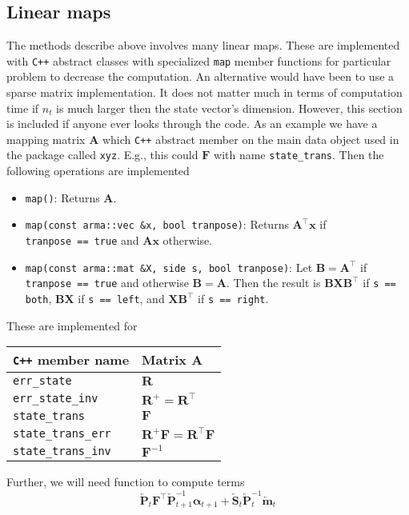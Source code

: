\documentclass[notitlepage]{article}
\renewcommand{\vec}[1]{\bm{#1}}
\newcommand{\vecLarrow}[1]{\overleftarrow{\vec{#1}}}
\newcommand{\mat}[1]{\mathbf{#1}}
\newcommand{\matLarrow}[1]{\overleftarrow{\mat{#1}}}
\begin{document}
\subsection{Linear maps}
The methods describe above involves many linear maps. These are implemented with \texttt{C++} 
abstract classes with specialized \texttt{map} member functions for particular problem to 
decrease the computation. An alternative would have been to use a sparse matrix implementation.
It does not matter much in terms of computation time if $n_t$ is much larger then 
the state vector's dimension. However, this section is included if anyone ever looks through 
the code.  
As an example we have a mapping matrix $\mat{A}$ which \texttt{C++} abstract member on the main 
data object used in the package called \texttt{xyz}. E.g., this could $\mat{F}$ with name 
\texttt{state\_trans}. Then the following operations are implemented %
%
\begin{itemize}
\item \texttt{map()}: Returns $\mat{A}$.
%
\item \texttt{map(const arma::vec \&x, bool tranpose)}: Returns $\mat{A}^\top\vec{x}$ if \\ \texttt{tranpose == true} and $\mat{A}\vec{x}$ otherwise.
%
\item \texttt{map(const arma::mat \&X, side s, bool tranpose)}: Let $\mat{B}=\mat{A}^\top$ if  \texttt{tranpose == true} and otherwise $\mat{B}=\mat{A}$. Then the result is  $\mat{B}\mat{X}\mat{B}^\top$ if \texttt{s == both}, $\mat{B}\mat{X}$ if \texttt{s == left}, and $\mat{X}\mat{B}^\top$ if \texttt{s == right}.
\end{itemize}%
%
These are implemented for %
%
\begin{center}
\begin{tabular}{ l l } 
 \texttt{C++} member name & Matrix $\mat{A}$ \\
 \hline
 \texttt{err\_state}               & $\mat{R}$ \\
 \texttt{err\_state\_inv}           & $\mat{R}^{+} = \mat{R}^\top$ \\
 \texttt{state\_trans}             & $\mat{F}$ \\
 \texttt{state\_trans\_err}         & $\mat{R}^{+}\mat{F} = \mat{R}^\top\mat{F}$ \\
 \texttt{state\_trans\_inv}         & $\mat{F}^{-1}$
\end{tabular}
\end{center}%
%
Further, we will need function to compute terms %
%
$$
	\matLarrow{P}_t\mat{F}^\top\matLarrow{P}_{t + 1}^{-1}\vec{\alpha}_{t+1}
		+ \matLarrow{S}_t\matLarrow{P}_t^{-1} \vecLarrow{m}_t
$$%
\end{document}
